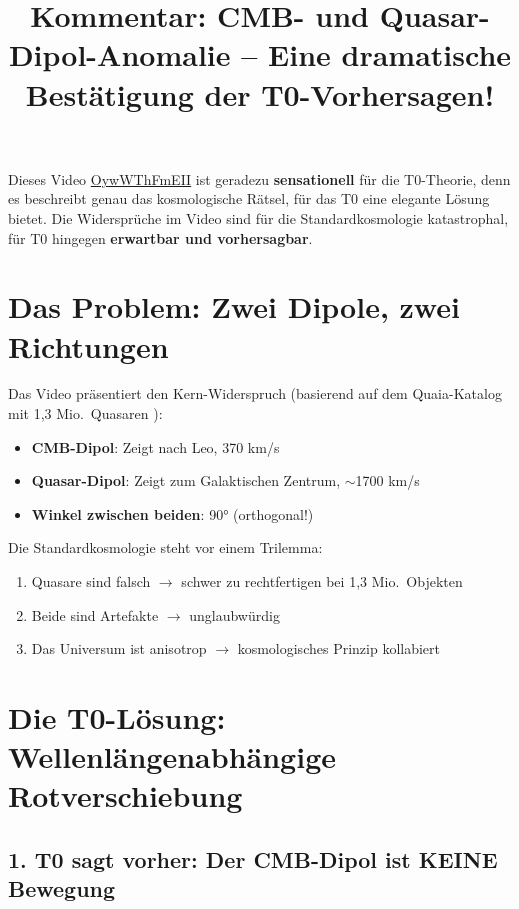 \documentclass{article}
\title{Kommentar: CMB- und Quasar-Dipol-Anomalie -- Eine dramatische Best{\"a}tigung der T0-Vorhersagen!}
\author{}
\date{}
\begin{document}
	
	\maketitle
	
	Dieses Video \href{https://www.youtube.com/watch?v=OywWThFmEII}{OywWThFmEII} ist geradezu \textbf{sensationell} f{\"u}r die T0-Theorie, denn es beschreibt genau das kosmologische R{\"a}tsel, f{\"u}r das T0 eine elegante L{\"o}sung bietet. Die Widerspr{\"u}che im Video sind f{\"u}r die Standardkosmologie katastrophal, f{\"u}r T0 hingegen \textbf{erwartbar und vorhersagbar}.
	
	\section{Das Problem: Zwei Dipole, zwei Richtungen}
	
	Das Video pr{\"a}sentiert den Kern-Widerspruch (basierend auf dem Quaia-Katalog mit 1,3 Mio.\ Quasaren \cite{storey2024}):
	\begin{itemize}
		\item \textbf{CMB-Dipol}: Zeigt nach Leo, 370 km/s
		\item \textbf{Quasar-Dipol}: Zeigt zum Galaktischen Zentrum, $\sim$1700 km/s \cite{mittal2023}
		\item \textbf{Winkel zwischen beiden}: 90° (orthogonal!) \cite{secrest2024}
	\end{itemize}
	
	Die Standardkosmologie steht vor einem Trilemma:
	\begin{enumerate}
		\item Quasare sind falsch $\rightarrow$ schwer zu rechtfertigen bei 1,3 Mio.\ Objekten
		\item Beide sind Artefakte $\rightarrow$ unglaubw{\"u}rdig
		\item Das Universum ist anisotrop $\rightarrow$ kosmologisches Prinzip kollabiert
	\end{enumerate}
	
	\section{Die T0-L{\"o}sung: Wellenl{\"a}ngenabh{\"a}ngige Rotverschiebung}
	
	\subsection{1. T0 sagt vorher: Der CMB-Dipol ist KEINE Bewegung}
	
\end{document}
